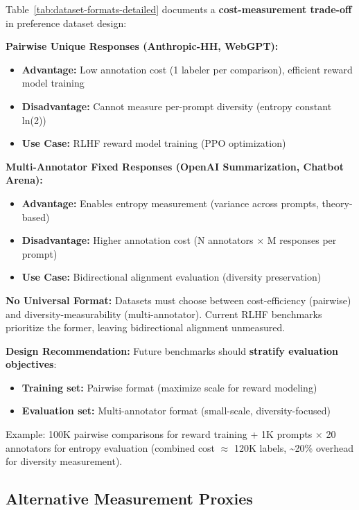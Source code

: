 Table~\ref{tab:dataset-formats-detailed} documents a \textbf{cost-measurement trade-off} in preference dataset design:

\textbf{Pairwise Unique Responses (Anthropic-HH, WebGPT):}
\begin{itemize}
\item \textbf{Advantage:} Low annotation cost (1 labeler per comparison), efficient reward model training
\item \textbf{Disadvantage:} Cannot measure per-prompt diversity (entropy constant ln(2))
\item \textbf{Use Case:} RLHF reward model training (PPO optimization)
\end{itemize}

\textbf{Multi-Annotator Fixed Responses (OpenAI Summarization, Chatbot Arena):}
\begin{itemize}
\item \textbf{Advantage:} Enables entropy measurement (variance across prompts, theory-based)
\item \textbf{Disadvantage:} Higher annotation cost (N annotators $\times$ M responses per prompt)
\item \textbf{Use Case:} Bidirectional alignment evaluation (diversity preservation)
\end{itemize}

\textbf{No Universal Format:} Datasets must choose between cost-efficiency (pairwise) and diversity-measurability (multi-annotator). Current RLHF benchmarks prioritize the former, leaving bidirectional alignment unmeasured.

\textbf{Design Recommendation:} Future benchmarks should \textbf{stratify evaluation objectives}:
\begin{itemize}
\item \textbf{Training set:} Pairwise format (maximize scale for reward modeling)
\item \textbf{Evaluation set:} Multi-annotator format (small-scale, diversity-focused)
\end{itemize}

Example: 100K pairwise comparisons for reward training + 1K prompts $\times$ 20 annotators for entropy evaluation (combined cost $\approx$ 120K labels, \textasciitilde{}20\% overhead for diversity measurement).

\subsection{Alternative Measurement Proxies}

